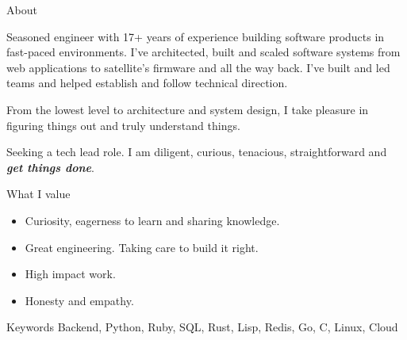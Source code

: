 \documentclass[colibri]{mcdowellcv}
\begin{document}
\makeheader
\begin{cvsection}{About}
  \begin{cvsubsection}{}{}{}
    Seasoned engineer with 17+ years of experience building software products in
    fast-paced environments. I've architected, built and scaled software systems
    from web applications to satellite's firmware and all the way back. I've
    built and led teams and helped establish and follow technical direction.

    From the lowest level to architecture and system design, I take pleasure in
    figuring things out and truly understand things.

    Seeking a tech lead role. I am diligent, curious, tenacious, straightforward
    and \textit{\textbf{get things done}}.
	\end{cvsubsection}
  \begin{cvsubsection}{What I value}{}{}
		\begin{itemize}
    \item Curiosity, eagerness to learn and sharing knowledge.
    \item Great engineering. Taking care to build it right.
    \item High impact work.
    \item Honesty and empathy.
    \end{itemize}
	\end{cvsubsection}
  \begin{cvsubsection}{Keywords}{}{}
    Backend, Python, Ruby, SQL, Rust, Lisp, Redis, Go, C, Linux, Cloud
  \end{cvsubsection}
\end{cvsection}
\end{document}
